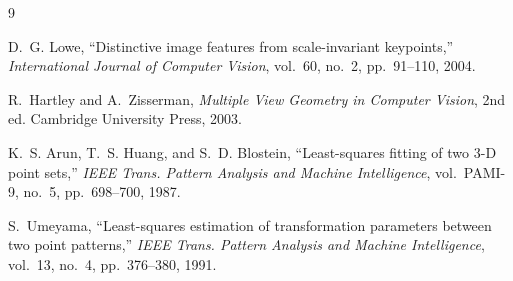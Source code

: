 \documentclass[10pt,twocolumn]{extarticle}
\begin{document}
\begin{thebibliography}{9}

D.~G. Lowe, ``Distinctive image features from scale-invariant keypoints,'' \textit{International Journal of Computer Vision}, vol.~60, no.~2, pp.~91--110, 2004.

R.~Hartley and A.~Zisserman, \textit{Multiple View Geometry in Computer Vision}, 2nd ed. Cambridge University Press, 2003.

K.~S. Arun, T.~S. Huang, and S.~D. Blostein, ``Least-squares fitting of two 3-D point sets,'' \textit{IEEE Trans. Pattern Analysis and Machine Intelligence}, vol.~PAMI-9, no.~5, pp.~698--700, 1987.

S.~Umeyama, ``Least-squares estimation of transformation parameters between two point patterns,'' \textit{IEEE Trans. Pattern Analysis and Machine Intelligence}, vol.~13, no.~4, pp.~376--380, 1991.

\end{thebibliography}
\end{document}
